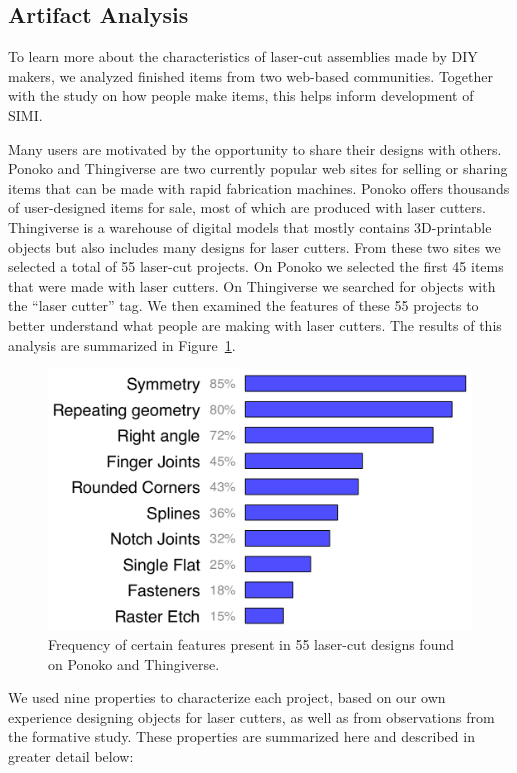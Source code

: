 \documentclass{article}
\begin{document}
\subsection{Artifact Analysis}

To learn more about the characteristics of laser-cut assemblies made
by DIY makers, we analyzed finished items from two web-based
communities. Together with the study on how people make items, this
helps inform development of SIMI.

Many users are motivated by the opportunity to share their designs
with others. Ponoko and Thingiverse are two currently popular web
sites for selling or sharing items that can be made with rapid
fabrication machines. Ponoko offers thousands of user-designed items
for sale, most of which are produced with laser cutters. Thingiverse
is a warehouse of digital models that mostly contains 3D-printable
objects but also includes many designs for laser cutters. From these
two sites we selected a total of 55 laser-cut projects. On Ponoko we
selected the first 45 items that were made with laser cutters. On
Thingiverse we searched for objects with the ``laser cutter'' tag. We
then examined the features of these 55 projects to better understand
what people are making with laser cutters. The results of this
analysis are summarized in Figure~\ref{fig:ponoko}.

\begin{figure}[h]
  \centering
  \includegraphics[width=0.9\linewidth]{img/ponoko-graph.pdf}
  \caption{Frequency of certain features present in 55 laser-cut
    designs found on Ponoko and Thingiverse.}
  \label{fig:ponoko}
\end{figure}

We used nine properties to characterize each project, based on our own
experience designing objects for laser cutters, as well as from
observations from the formative study. These properties are summarized
here and described in greater detail below:
\end{document}
